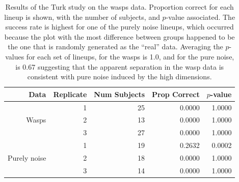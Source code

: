 



\begin{table}[ht]
\begin{center}
\caption{Results of the Turk study on the wasps data. Proportion correct for each lineup is shown, with the number of subjects, and $p$-value associated. The success rate is highest for one of the purely noise lineups, which occurred because the plot with the most difference between groups happened to be the one that is randomly generated as the ``real'' data. Averaging the $p$-values for each set of lineups, for the wasps is 1.0, and for the pure noise, is 0.67 suggesting that the apparent separation in the wasp data is consistent with pure noise induced by the high dimensions.}
\vspace{0.15cm}
\begin{tabular}{r|r|r|rr}
\hline
  \hline
 Data & Replicate & Num Subjects & Prop Correct & $p$-value\\ 
  \hline
  & 1 & 25 & 0.0000 &  1.0000\\
Wasps & 2 & 13 & 0.0000 &  1.0000\\ 
 & 3 & 27 & 0.0000 &  1.0000\\
 \hline
 & 1 & 19 & 0.2632 &  0.0002\\
Purely noise & 2 & 18 & 0.0000 &  1.0000 \\ 
 & 3 & 14 & 0.0000 &  1.0000\\
   \hline
\end{tabular}
\label{wasp}
\end{center}
\end{table}

